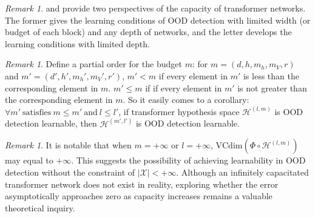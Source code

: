 \documentclass{article}
\theoremstyle{plain}
\theoremstyle{definition}
\theoremstyle{remark}
\newtheorem{remark}[theorem]{Remark}
\begin{document}
\begin{remark}
    \citet{yun2019transformers} and \citet{jiang2023approximation} provide two perspectives of the capacity of transformer networks. The former gives the learning conditions of OOD detection with limited width (or budget of each block) and any depth of networks, and the letter develops the learning conditions with limited depth.
\end{remark}

\begin{remark}
    Define a partial order for the budget $m$: for $m = (d, h, m_h, m_V , r)$ and $m' = (d', h', m_h', m_V' , r')$, $m'<m$ if every element in $m'$ is less than the corresponding element in $m$. $m'\leq m$ if if every element in $m'$ is not greater than the corresponding element in $m$. So it easily comes to a corollary: 
    $\forall m'~\text{satisfies}~m\leq m'~\text{and}~l\leq l'$, if transformer hypothesis space $\mathcal{H}^{(l,m)}$ is OOD detection learnable, then $\mathcal{H}^{(m',l')}$ is OOD detection learnable.
    \label{remark-b3}
\end{remark}

\begin{remark}
    It is notable that when $m=+\infty$ or $l=+\infty$, $\text{VCdim}(\Phi\circ\mathcal{H}^{(l,m)})$ may equal to $+\infty$. This suggests the possibility of achieving learnability in OOD detection without the constraint of  $|\mathcal{X}|<+\infty$. Although an infinitely capacitated transformer network does not exist in reality, exploring whether the error asymptotically approaches zero as capacity increases remains a valuable theoretical inquiry.
    \label{remark3}
\end{remark}
\end{document}
